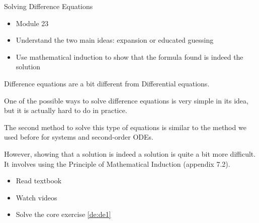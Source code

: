 %
%
%
%
%
%
%
%











%
%



\begin{module}{Solving Difference Equations}
	\label{diff:solve}

	
	
\end{module}



\begin{lesson}

	\begin{itemize}
		\item Module 23
	\end{itemize}

	\begin{itemize}
		\item Understand the two main ideas: expansion or educated guessing
		\item Use mathematical induction to show that the formula found is indeed the solution
	\end{itemize}
	


Difference equations are a bit different from Differential equations.

One of the possible ways to solve difference equations is very simple in its idea, but it is actually hard to do in practice.

The second method to solve this type of equations is similar to the method we used before for systems and second-order ODEs.

However, showing that a solution is indeed a solution is quite a bit more difficult. It involves using the Principle of Mathematical Induction (appendix 7.2).

\begin{itemize}
	\item Read textbook
	\item Watch videos
	\item Solve the core exercise \ref{de:de1}
\end{itemize}

\end{lesson}





